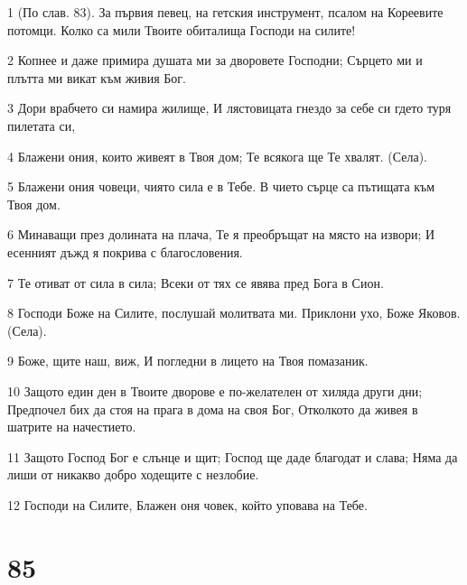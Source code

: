 \par 1 (По слав. 83). За първия певец, на гетския инструмент, псалом на Кореевите потомци. Колко са мили Твоите обиталища Господи на силите!
\par 2 Копнее и даже примира душата ми за дворовете Господни; Сърцето ми и плътта ми викат към живия Бог.
\par 3 Дори врабчето си намира жилище, И лястовицата гнездо за себе си гдето туря пилетата си,
\par 4 Блажени ония, които живеят в Твоя дом; Те всякога ще Те хвалят. (Села).
\par 5 Блажени ония човеци, чиято сила е в Тебе. В чието сърце са пътищата към Твоя дом.
\par 6 Минаващи през долината на плача, Те я преобръщат на място на извори; И есенният дъжд я покрива с благословения.
\par 7 Те отиват от сила в сила; Всеки от тях се явява пред Бога в Сион.
\par 8 Господи Боже на Силите, послушай молитвата ми. Приклони ухо, Боже Яковов. (Села).
\par 9 Боже, щите наш, виж, И погледни в лицето на Твоя помазаник.
\par 10 Защото един ден в Твоите дворове е по-желателен от хиляда други дни; Предпочел бих да стоя на прага в дома на своя Бог, Отколкото да живея в шатрите на начестието.
\par 11 Защото Господ Бог е слънце и щит; Господ ще даде благодат и слава; Няма да лиши от никакво добро ходещите с незлобие.
\par 12 Господи на Силите, Блажен оня човек, който уповава на Тебе.

\chapter{85}

